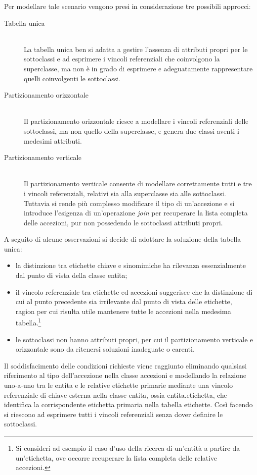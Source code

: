 Per modellare tale scenario vengono presi in considerazione tre possibili approcci:
\begin{description}
\item[Tabella unica] \hfill \\
La tabella unica ben si adatta a gestire l'assenza di attributi propri per le sottoclassi e ad esprimere i vincoli referenziali che coinvolgono la superclasse, ma non è in grado di esprimere e adeguatamente rappresentare quelli coinvolgenti le sottoclassi.
\item[Partizionamento orizzontale] \hfill \\
Il partizionamento orizzontale riesce a modellare i vincoli referenziali delle sottoclassi, ma non quello della superclasse, e genera due classi aventi i medesimi attributi.
\item[Partizionamento verticale] \hfill \\
Il partizionamento verticale consente di modellare correttamente tutti e tre i vincoli referenziali, relativi sia alla superclasse sia alle sottoclassi. Tuttavia si rende più complesso modificare il tipo di un'accezione e si introduce l'esigenza di un'operazione \textit{join} per recuperare la lista completa delle accezioni, pur non possedendo le sottoclassi attributi propri.
\end{description}

A seguito di alcune osservazioni si decide di adottare la soluzione della tabella unica:
\begin{itemize}
\item la distinzione tra etichette chiave e sinomimiche ha rilevanza essenzialmente dal punto di vista della classe \textsf{entita};
\item il vincolo referenziale tra \textsf{etichette} ed \textsf{accezioni} suggerisce che la distinzione di cui al punto precedente sia irrilevante dal punto di vista delle etichette, ragion per cui risulta utile mantenere tutte le accezioni nella medesima tabella.\footnote{Si consideri ad esempio il caso d'uso della ricerca di un'entità a partire da un'etichetta, ove occorre recuperare la lista completa delle relative accezioni.}
\item le sottoclassi non hanno attributi propri, per cui il partizionamento verticale e orizzontale sono da ritenersi soluzioni inadeguate o carenti.
\end{itemize}

Il soddisfacimento delle condizioni richieste viene raggiunto eliminando qualsiasi riferimento al tipo dell'accezione nella classe \textsf{accezioni} e modellando la relazione uno-a-uno tra le entita e le relative etichette primarie mediante una vincolo referenziale di chiave esterna nella classe \textsf{entita}, ossia \textsf{entita.etichetta}, che identifica la corrispondente etichetta primaria nella tabella \textsf{etichette}. Così facendo si riescono ad esprimere tutti i vincoli referenziali senza dover definire le sottoclassi.

